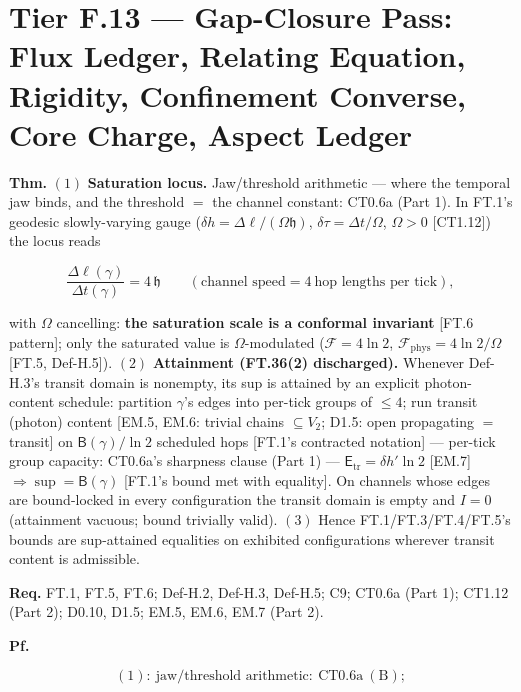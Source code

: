 \section[Tier F.13 — Gap-Closure Pass: Flux Ledger, Relating…]{\texorpdfstring{Tier F.13 — Gap-Closure Pass: Flux Ledger, Relating Equation, Rigidity, Confinement Converse, Core Charge, Aspect Ledger}{Tier F.13 - Gap-Closure Pass: Flux Ledger, Relating Equation, Rigidity, Confinement Converse, Core Charge, Aspect Ledger}}

\begin{theorem}\label{tag:FT-36}
\textbf{Thm.} $(1)$ \textbf{Saturation locus.} Jaw/threshold arithmetic — where the temporal jaw binds, and the threshold $=$ the channel constant: CT0.6a (Part 1). In FT.1's geodesic slowly-varying gauge ($\delta h=\Delta\ell/(\Omega\mathfrak h)$, $\delta\tau=\Delta t/\Omega$, $\Omega>0$ [CT1.12]) the locus reads

\[
\frac{\Delta\ell(\gamma)}{\Delta t(\gamma)}=4\,\mathfrak h\qquad(\text{channel speed}=4\ \text{hop lengths per tick}),
\]

with $\Omega$ cancelling: \textbf{the saturation scale is a conformal invariant} [FT.6 pattern]; only the saturated value is $\Omega$-modulated ($\mathcal F=4\ln2$, $\mathcal F_{\mathrm{phys}}=4\ln2/\Omega$ [FT.5, Def-H.5]). $(2)$ \textbf{Attainment (FT.36(2) discharged).} Whenever Def-H.3's transit domain is nonempty, its sup is attained by an explicit photon-content schedule: partition $\gamma$'s edges into per-tick groups of $\le4$; run transit (photon) content [EM.5, EM.6: trivial chains $\subseteq V_2$; D1.5: open propagating $=$ transit] on $\mathsf B(\gamma)/\ln2$ scheduled hops [FT.1's contracted notation] — per-tick group capacity: CT0.6a's sharpness clause (Part 1) — $\mathsf E_{\mathrm{tr}}=\delta h'\ln2$ [EM.7] $\Rightarrow\sup=\mathsf B(\gamma)$ [FT.1's bound met with equality]. On channels whose edges are bound-locked in every configuration the transit domain is empty and $I=0$ (attainment vacuous; bound trivially valid). $(3)$ Hence FT.1/FT.3/FT.4/FT.5's bounds are sup-attained equalities on exhibited configurations wherever transit content is admissible.

\textbf{Req.} FT.1, FT.5, FT.6; Def-H.2, Def-H.3, Def-H.5; C9; CT0.6a (Part 1); CT1.12 (Part 2); D0.10, D1.5; EM.5, EM.6, EM.7 (Part 2).

\textbf{Pf.}

\[
(1):\ \text{jaw/threshold arithmetic}:\ \mathrm{CT0.6a}\ (\text{B});
\]


\end{theorem}
